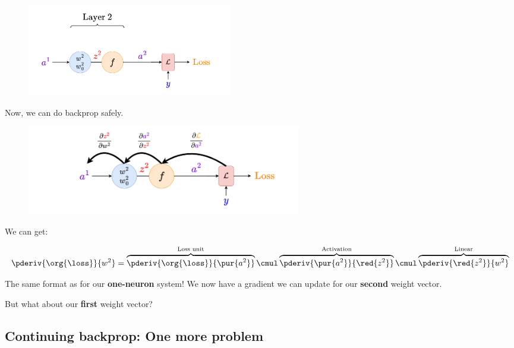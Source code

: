         \begin{figure}[H]
            \centering
            \includegraphics[width=90mm,scale=0.4]{images/nn_2_images/layer2_bp.png}
        \end{figure}
        
        Now, we can do backprop safely.
        
        \begin{figure}[H]
            \centering
            \includegraphics[width=120mm,scale=0.4]{images/nn_2_images/layer2_bp1.png}
        \end{figure}
        
        We can get:
        
        \begin{equation}
            \pderiv {\org{\loss}} {w^2} 
            =
            \overbrace{
                \pderiv {\org{\loss}} {\pur{a^2}} 
            }^{\text{Loss unit}}
            \cmul
            \overbrace{
                \pderiv {\pur{a^2}}     {\red{z^2}}
            }^{\text{Activation}}
                \cmul
            \overbrace{
                \pderiv {\red{z^2}}     {w^2}
            }^{\text{Linear}}
        \end{equation}
        
        The same format as for our \textbf{one-neuron} system! We now have a gradient we can update for our \textbf{second} weight vector.
        
        But what about our \textbf{first} weight vector?
        
    \phantom{}
    
    \subsection{Continuing backprop: One more problem}
    
